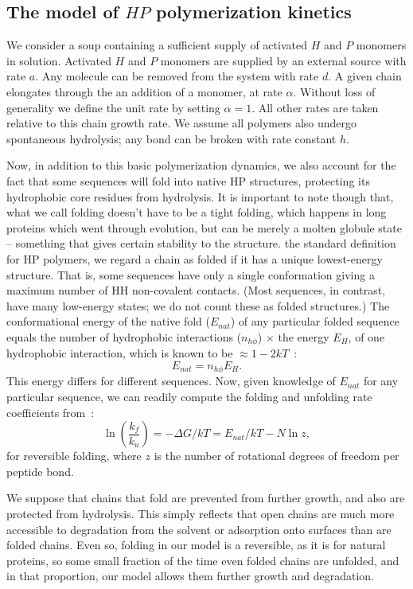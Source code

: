 \documentclass[journal=jacsat,manuscript=article,layout=twocolumn]{achemso}
\newcommand*{\ga}{\alpha}
\newcommand*{\gD}{\Delta}
\newcommand*{\pt}[1]{\left( #1\right)}
\begin{document}
\subsection{The model of $HP$ polymerization kinetics}

 We consider a soup containing a sufficient supply of activated $H$ and $P$ monomers in solution. 
 Activated $H$ and $P$ monomers are supplied by an external source with rate $a$.  Any molecule can 
be removed from the system with rate $d$.  A given chain elongates through the 
an addition of a monomer, at rate $\ga$. Without loss of 
generality we define the unit rate by setting $\ga = 1$.  All other rates are taken relative to 
this 
chain growth rate.  We assume all polymers also undergo spontaneous hydrolysis; any bond can be 
broken with rate constant $h$.  

 Now, in addition to this basic polymerization dynamics, we also account for the fact that some 
sequences 
will fold into native HP structures, protecting its hydrophobic core residues from hydrolysis. It 
is important to note though that, what we call folding doesn't have to be a tight folding, which 
happens in long proteins which went through evolution, but can be merely a molten globule state -- 
something that gives certain stability to the structure.
the standard definition for HP polymers, we regard a chain as folded if it has a unique 
lowest-energy structure.  That is, some sequences have only a single conformation giving a maximum 
number of HH non-covalent contacts.  (Most sequences, in contrast, 
have many low-energy states; we do not count these as folded structures.)  
The conformational energy of the native fold ($E_{nat}$) of any particular folded sequence equals 
the number of hydrophobic interactions ($n_{h\phi}$) $\times$ the energy $E_H$, of one hydrophobic 
interaction, which is known to be $\approx 1-2kT$~\cite{Ghosh2009}:
\begin{equation}
 E_{nat}=n_{h\phi}E_H.
\end{equation} 
This energy differs for different sequences.  Now, given knowledge of $E_{nat}$ for any particular 
sequence, we can readily compute the folding and unfolding rate coefficients from~\cite{Ghosh2009}:
\begin{equation}
 \ln\pt{\frac{k_f}{k_u}}=-\gD G/kT = E_{nat}/kT-N\ln z,
\end{equation} 
for reversible folding, where $z$ is the number of rotational degrees of freedom per peptide bond.  

We suppose that chains that fold are prevented from further growth, and also are protected from 
hydrolysis.  This simply reflects that open chains are much more accessible to degradation from the 
solvent or adsorption onto surfaces than are folded chains.  Even so, folding in our model is a 
reversible, as it is for natural proteins, so some small fraction of the time even 
folded chains are unfolded, and in that proportion, our model allows them further growth and 
degradation.
 
\end{document}

